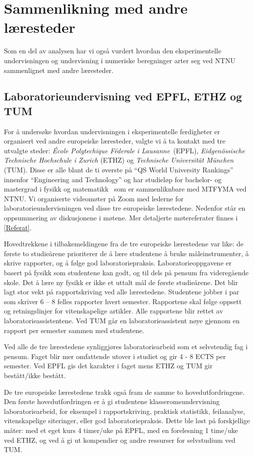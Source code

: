 \documentclass{article}
\begin{document}
\section{Sammenlikning med andre læresteder}
Som en del av analysen har vi også vurdert hvordan den eksperimentelle undervisningen og undervisning i numeriske beregninger arter seg ved NTNU sammenlignet med andre læresteder.

\subsection{Laboratorieundervisning ved EPFL, ETHZ og TUM}
For å undersøke hvordan undervisningen i eksperimentelle ferdigheter er organisert ved andre europeiske læresteder, valgte vi å ta kontakt med tre utvalgte steder: \emph{École Polytechique Féderale i Lausanne}~(EPFL), \emph{Eidgenössische Technische Hochschule i Zurich} (ETHZ) og \emph{Technische Universität München} (TUM). Disse er alle blant de ti øverste på ``QS World University Rankings'' innenfor ``Engineering and Technology'' og har studieløp for bachelor- og mastergrad i fysikk og matematikk~\cite{ETHZprog,EPFLprog,TUMprog} som er sammenliknbare med MTFYMA ved NTNU.
Vi organiserte videomøter på Zoom med lederne for laboratorieundervisningen ved disse tre europeiske lærestedene. Nedenfor står en oppsummering av diskusjonene i møtene. Mer detaljerte møtereferater finnes i \cref{Referat}.

Hovedtrekkene i tilbakemeldingene fra de tre europeiske lærestedene var like: de første to studieårene prioriterer de å lære studentene å bruke måleinstrumenter, å skrive rapporter, og å følge god laboratoriepraksis. Laboratorieoppgavene er basert på fysikk som studentene kan godt, og til dels på pensum fra videregående skole. Det å lære ny fysikk er ikke et uttalt mål de første studieårene. Det blir lagt stor vekt på rapportskriving ved alle lærestedene. Studentene jobber i par som skriver 6 – 8 felles rapporter hvert semester. Rapportene skal følge oppsett og retningslinjer for vitenskapelige artikler. Alle rapportene blir rettet av laboratorieassistentene. Ved TUM går en laboratorieassistent nøye gjennom en rapport per semester sammen med studentene.

Ved alle de tre lærestedene synliggjøres laboratoriearbeid som et selvstendig fag i pensum. Faget blir mer omfattende utover i studiet og gir 4 - 8 ECTS per semester. Ved EPFL gis det karakter i faget mens ETHZ og TUM gir bestått/ikke bestått.

De tre europeiske lærestedene trakk også fram de samme to hovedutfordringene. Den første hovedutfordringen er å gi studentene klasseromsundervisning laboratoriearbeid, for eksempel i rapportskriving, praktisk statistikk, feilanalyse, vitenskapelige siteringer, eller god laboratoriepraksis. Dette ble løst på forskjellige måter: med et eget kurs 4 timer/uke på EPFL, med en forelesning 1 time/uke ved ETHZ, og ved å gi ut kompendier og andre ressurser for selvstudium ved TUM.
\end{document}
